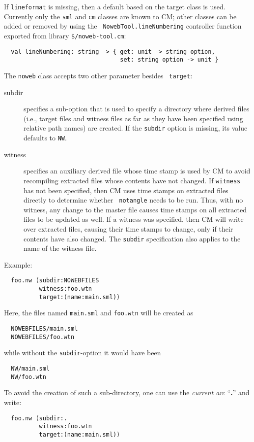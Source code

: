 \documentclass[titlepage,letterpaper]{article}
\begin{document}
If {\tt lineformat} is missing, then a default based on the target
class is used.  Currently only the {\tt sml} and {\tt cm} classes are
known to CM; other classes can be added or removed by using the {\tt
NowebTool.lineNumbering} controller function exported from library
{\tt \$/noweb-tool.cm}:

\begin{verbatim}
  val lineNumbering: string -> { get: unit -> string option,
                                 set: string option -> unit }
\end{verbatim}

The {\tt noweb} class accepts two other parameter besides {\tt
target}:

\begin{description}
\item[subdir] specifies a sub-option that is used to specify a
directory where derived files (i.e., target files and witness files as
far as they have been specified using relative path names) are
created.  If the {\tt subdir} option is missing, its value defaults to
{\tt NW}.
\item[witness] specifies an auxiliary derived file whose time stamp is
used by CM to avoid recompiling extracted files whose contents have
not changed.  If {\tt witness} has not been specified, then CM uses
time stamps on extracted files directly to determine whether {\tt
notangle} needs to be run.  Thus, with no witness, any change to the
master file causes time stamps on all extracted files to be updated as
well.  If a witness was specified, then CM will write over extracted
files, causing their time stamps to change, only if their contents
have also changed.  The {\tt subdir} specification also applies to the
name of the witness file.
\end{description}

Example:

\begin{verbatim}
  foo.nw (subdir:NOWEBFILES
          witness:foo.wtn
          target:(name:main.sml))
\end{verbatim}

Here, the files named {\tt main.sml} and {\tt foo.wtn} will be
created as
\begin{verbatim}
  NOWEBFILES/main.sml
  NOWEBFILES/foo.wtn
\end{verbatim}
\noindent while without the {\tt subdir}-option it would have been
\begin{verbatim}
  NW/main.sml
  NW/foo.wtn
\end{verbatim}
\noindent To avoid the creation of such a sub-directory, one can use
the {\em current arc} ``{\bf .}'' and write:
\begin{verbatim}
  foo.nw (subdir:.
          witness:foo.wtn
          target:(name:main.sml))
\end{verbatim}
\end{document}
